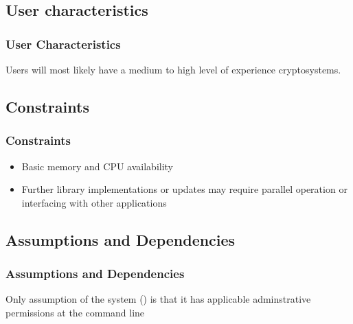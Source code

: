 
\subsection{User characteristics}
\begin{frame}
\frametitle{User Characteristics}
Users will most likely have a medium  to high level of experience cryptosystems.
\end{frame}


\subsection{Constraints}

\begin{frame}
\frametitle{Constraints}
\begin{itemize}
  \item Basic memory and CPU availability
  \item Further library implementations or updates may require parallel operation or interfacing with other applications
\end{itemize}
\end{frame}


\subsection{Assumptions and Dependencies}

\begin{frame}
\frametitle{Assumptions and Dependencies}
Only assumption of the system (\cry{}) is that it has applicable adminstrative permissions at the command line
\end{frame}

